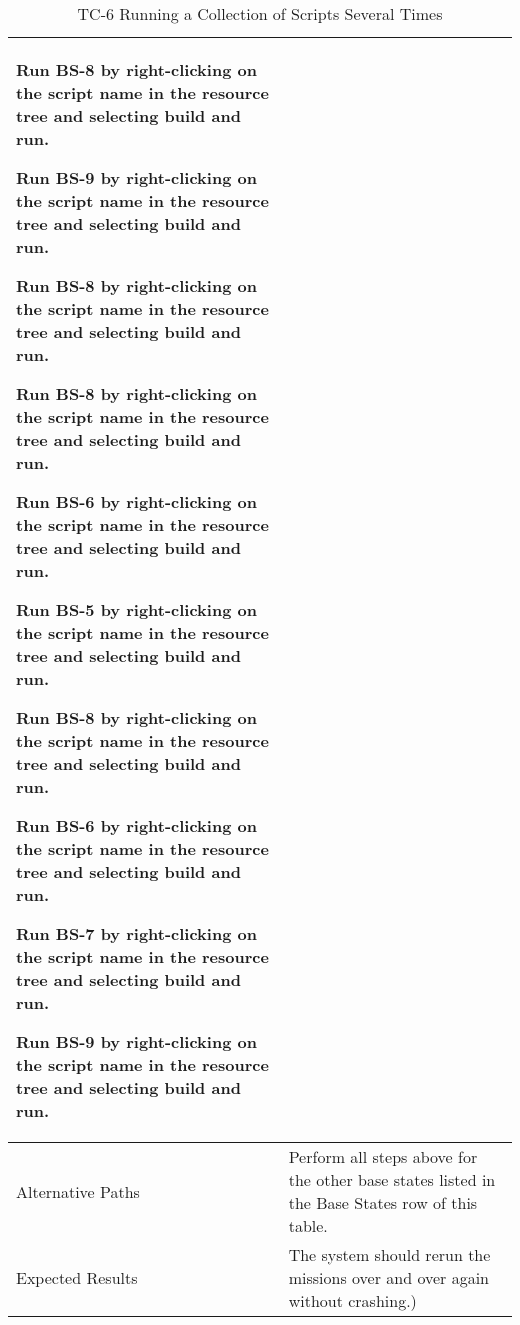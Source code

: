 \begin{table}[htbp!]
\begin{tabular}{|p{1.05 in} |p{4.75 in} |}
\begin{compactenum}
             \item Run BS-8 by right-clicking on the script name in the resource tree and selecting build and run.
             \item Run BS-9 by right-clicking on the script name in the resource tree and selecting build and run.
             \item Run BS-8 by right-clicking on the script name in the resource tree and selecting build and run.
             \item Run BS-8 by right-clicking on the script name in the resource tree and selecting build and run.
             \item Run BS-6 by right-clicking on the script name in the resource tree and selecting build and run.
             \item Run BS-5 by right-clicking on the script name in the resource tree and selecting build and run.   
             \item Run BS-8 by right-clicking on the script name in the resource tree and selecting build and run.
             \item Run BS-6 by right-clicking on the script name in the resource tree and selecting build and run.
             \item Run BS-7 by right-clicking on the script name in the resource tree and selecting build and run.
             \item Run BS-9 by right-clicking on the script name in the resource tree and selecting build and run.   
         \end{compactenum}
         \\ \hline
         Alternative Paths &
         Perform all steps above for the other base states listed in the Base States row of this table.
         \\ \hline
         Expected Results & The system should rerun the missions over and over again without crashing.)\\
      \hline
      \end{tabular}
      \label{Table:TC-6}
      \caption{TC-6 Running a Collection of Scripts Several Times}
\end{table} 